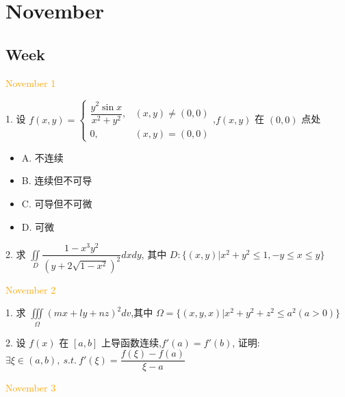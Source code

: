 \chapter{November}
\section{Week }
\textcolor{orange}{November 1}

1. 设 $f(x,y)=
\begin{cases}
	\dfrac{y^2\sin x}{x^2+y^2}, &(x,y)\neq (0,0)\\
	0, &(x,y)=(0,0)
\end{cases}$,$f(x,y)$ 在 $(0,0)$ 点处
\begin{itemize}
	\item A. 不连续
	\item B. 连续但不可导
	\item C. 可导但不可微
	\item D. 可微
\end{itemize}
\begin{solution}
	
\end{solution}

2. 求 $\displaystyle{\iint\limits_{D}\dfrac{1-x^3y^2}{(y+2\sqrt{1-x^2})^2}dxdy}$, 其中 $D:\{(x,y)|x^2+y^2\leq 1,-y\leq x\leq y\}$
\begin{solution}
	
\end{solution}

\textcolor{orange}{November 2}

1. 求 $\displaystyle{\iiint\limits_{\Omega}(mx+ly+nz)^2dv}$,其中 $\Omega=\{(x,y,x)|x^2+y^2+z^2\leq a^2(a>0)\}$
\begin{solution}
	
\end{solution}

2. 设 $f(x)$ 在 $[a,b]$ 上导函数连续,$f'(a)=f'(b)$, 证明: $\exists \xi\in(a,b),\ s.t.\ f'(\xi)=\dfrac{f(\xi)-f(a)}{\xi-a}$
\begin{solution}
	
\end{solution}

\textcolor{orange}{November 3}

